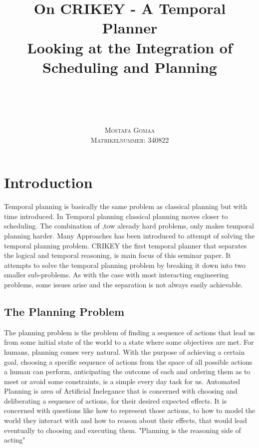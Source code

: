 \documentclass
[a4paper
,english
,parskip=half
,bibliography=totoc
]{scrreprt}
\title{
    On CRIKEY - A Temporal Planner\\ 
    Looking at the Integration of\\
    Scheduling and Planning
}
\author{
    \\
    \\
    \\
    \\
    \scshape Mostafa Gomaa\\
    \scshape \small Matrikelnummer: 340822
}
\date{}
\begin{document}
\pagestyle{useheadings}
\maketitle
\tableofcontents
\cleardoublepage
\pagestyle{scrheadings}




\chapter{Introduction}

Temporal planning is basically the same problem as classical planning but with time introduced. In Temporal planning classical planning moves closer to scheduling. The combination of ,tow already hard problems, only makes temporal planning harder. Many Approaches has been introduced to attempt of solving the temporal planning problem.
CRIKEY the first temporal planner that separates the logical and temporal reasoning, is main focus of this seminar paper. It attempts to solve the temporal planning problem by breaking it down into two smaller sub-problems. As with the case with most interacting engineering problems, some issues arise and the separation is not always easily achievable.  

    \section{The Planning Problem} \label{the_planning_problem}
    The planning problem is the problem of finding a sequence of actions that lead us from some initial state of the world to a state where some objectives are met. For humans, planning comes very natural. With the purpose of achieving a certain goal, choosing a specific sequence of actions from the space of all possible actions a human can perform, anticipating the outcome of each and ordering them as to meet or avoid some constraints, is a simple every day task for us. Automated Planning is area of Artificial Inelegance that is concerned with choosing and deliberating a sequence of actions, for their desired expected effects. It is concerned with questions like how to represent those actions, to how to model the world they interact with and how to reason about their effects, that would lead eventually to choosing and executing them.
    "Planning is the reasoning side of acting" \citep{automated_planning}
\end{document}
